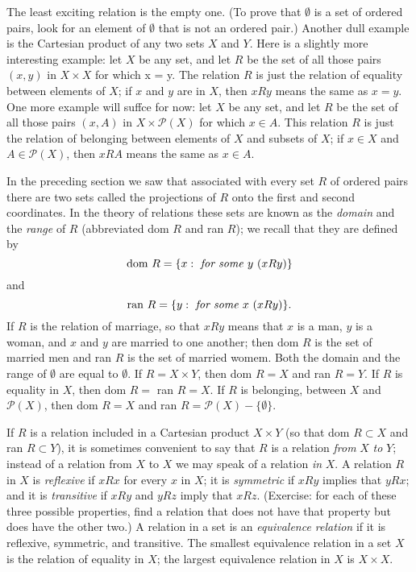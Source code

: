 The least exciting relation is the empty one. (To prove that $ \emptyset $ is a set of ordered pairs, look for an element of $ \emptyset $ that is not an ordered pair.) Another dull example is the Cartesian product of any two sets $X$ and $Y$. Here is a slightly more interesting example: let $X$ be any set, and let $R$ be the set of all those pairs $(x, y)$ in $X \times X$ for which x = y. The relation $R $ is just the relation of equality between elements of $X$; if $x$ and $y$ are in $X$, then $x R y$ means the same as $x = y$. One more example will suffce for now: let $X$ be any set, and let $R $ be the set of all those pairs $(x, A)$ in $X \times \mathcal{P} (X)$ for which $x \in A$. This relation $R $ is just the relation of belonging between elements of $X$ and subsets of $X$; if $x \in X$ and $A \in \mathcal{P}(X)$, then $x R A$ means the same as $x \in A$. 

In the preceding section we saw that associated with every set $R$ of ordered pairs there are two sets called the projections of $R$ onto the first and second coordinates. In the theory of relations these sets are known as the \textit{domain} and the \textit{range} of $R$  (abbreviated dom $R$ and ran $R$); we recall that they are defined by 
\begin{equation*}
\text{dom } R = \{ x: \text{ \textit{for some} } y\ (x R y) \}
\end{equation*}
and
\begin{equation*}
\text{ran } R = \{ y: \text{ \textit{for some} } x\ (x R y) \}.
\end{equation*}
If $R$ is the relation of marriage, so that $x R y$ means that $x$ is a man, $y$ is a woman, and $x$ and $y$ are married to one another; then dom $R$ is the set of married men and ran $R$ is the set of married womem. Both the domain and the range of $\emptyset$ are equal to $\emptyset$. If $R = X \times Y$, then dom $ R = X$ and ran $R = Y$. If $R$ is equality in $X$, then dom $R =$ ran $R = X$. If $R$ is belonging, between $X$ and $\mathcal{P}(X)$, then dom $R = X$ and ran $R = \mathcal{P}(X) - \{ \emptyset \}$. 

If $R$ is a relation included in a Cartesian product $X \times Y$ (so that dom $R \subset X$ and ran $R \subset Y$), it is sometimes convenient to say that $R$ is a relation \textit{from} $X$ \textit{to} $Y$; instead of a relation from $X$ to $X$ we may speak of a relation \textit{in} $X$. A relation $R$ in $X$ is \textit{reflexive} if $x R x$ for every $x$ in $X$; it is \textit{symmetric} if $ x R y$ implies that $y R x$; and it is \textit{transitive} if $x R y$ and $y R z$ imply that $x R z$. (Exercise: for each of these three possible properties, find a relation that does not have that property but does have the other two.) A relation in a set is an \textit{equivalence relation} if it is reflexive, symmetric, and transitive. The smallest equivalence relation in a set $X$ is the relation of equality in $X$; the largest equivalence relation in $X$ is $X \times X$. 

